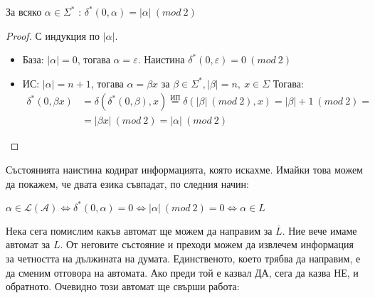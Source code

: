 \begin{claim}
    За всяко $\alpha \in \Sigma^*$ : $\delta^*(0, \alpha) = |\alpha| \: (mod \: 2)$
\end{claim}

\begin{proof}
    С индукция по $|\alpha|$.
    \begin{itemize}
        \item База: $|\alpha| = 0$, тогава $\alpha = \varepsilon$.
              Наистина $\delta^*(0, \varepsilon) = 0 \: (mod \: 2)$ \checkmark
        \item ИС: $|\alpha| = n + 1$, тогава $\alpha = \beta x$ за $\beta \in \Sigma^*, |\beta| = n, \: x \in \Sigma$
              Тогава:
              \begin{align*}
                  \delta^*(0, \beta x) & = \delta(\delta^*(0, \beta), x) \stackrel{\text{ИП}}{=}
                  \delta(|\beta| \: (mod \: 2), x) = |\beta| + 1 \: (mod \: 2) =                 \\
                                       & = |\beta x| \: (mod \: 2) = |\alpha| \: (mod \: 2)
              \end{align*}
    \end{itemize}
\end{proof}

Състоянията наистина кодират информацията, която искахме.
Имайки това можем да покажем, че двата езика съвпадат, по следния начин:
\begin{center}
    $\alpha \in \mathcal{L(A)} \iff \delta^*(0, \alpha) = 0 \iff |\alpha| \: (mod \: 2) = 0 \iff \alpha \in L$
\end{center}


Нека сега помислим какъв автомат ще можем да направим за $\overline{L}$.
Ние вече имаме автомат за $L$.
От неговите състояние и преходи можем да извлечем информация за четността на дължината на думата.
Единственото, което трябва да направим, е да сменим отговора на автомата.
Ако преди той е казвал ДА, сега да казва НЕ, и обратното.
Очевидно този автомат ще свърши работа:
\begin{center}
\end{center}